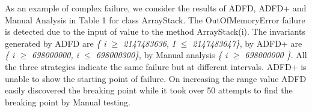 As an example of complex failure, we consider the results of ADFD, ADFD+ and Manual Analysis in Table 1 for class ArrayStack. The OutOfMemoryError failure is detected due to the input of value to the method ArrayStack(i). The invariants generated by ADFD are \textit{\{ i $\ge$ 2147483636, I $\le$ 2147483647\}}, by ADFD+ are \textit{\{ i $\ge$ 698000000, i $\le$ 698000300\}}, by Manual analysis \textit{\{ i $\ge$ 698000000 \}}. All the three strategies indicate the same failure but at different intervals. ADFD+ is unable to show the starting point of failure. On increasing the range value ADFD easily discovered the breaking point while it took over 50 attempts to find the breaking point by Manual testing.











